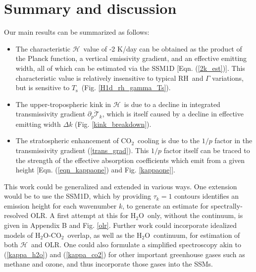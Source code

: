 \documentclass{ametsoc}
\newcommand{\eqnref}[1]{(\ref{#1})}
\newcommand{\ppp}{\ensuremath{\partial_p}}
\newcommand{\Ts}{\ensuremath{T_\mathrm{s}}}
\newcommand{\cotwo}{\ensuremath{\mathrm{CO_2}}}
\newcommand{\htwo}{\ensuremath{\mathrm{H_2O}}}
\newcommand{\RH}{\ensuremath{\mathrm{RH}}}
\newcommand{\trans}{\ensuremath{\mathcal{T}}}
\newcommand{\ch}{\ensuremath{\mathcal{H}}}
\newcommand{\tauk}{\ensuremath{\tau_k}}
\begin{document}
\section{Summary and discussion} \label{sec_summary}
Our main results can be summarized as follows:
\begin{itemize}
	\item The characteristic \ch\ value of  -2 K/day can be obtained as the product of the Planck function, a vertical emissivity gradient, and an effective emitting width, all of which can be estimated via the SSM1D [Eqn. \eqnref{2k_est}]. This characteristic value is relatively insensitive to typical \RH\ and $\Gamma$ variations, but is sensitive to \Ts\ (Fig. \ref{H1d_rh_gamma_Ts}).
	\item  The upper-tropospheric kink in \ch\ is due to a decline in integrated transmissivity gradient $\overline{\ppp \trans_k}$, which is itself caused by a decline in effective emitting width $\Delta k$ (Fig. \ref{kink_breakdown}). 
	\item The stratospheric enhancement of \cotwo\ cooling is due to the $1/p$ factor in the transmissivity gradient \eqnref{trans_grad}. This $1/p$ factor itself can be traced to the strength of the effective absorption coefficients which emit from a given height [Eqn. \eqnref{eqn_kappaone} and Fig. \ref{kappaone}].		
\end{itemize}

This work could be generalized and extended in various ways. One extension would be to use the SSM1D, which by providing $\tauk=1$ contours identifies an emission height for each wavenumber $k$, to generate an estimate for spectrally-resolved OLR. A first attempt at this for \htwo\ only, without the continuum, is given in Appendix B and Fig. \ref{olr}. Further work could incorporate idealized models of  \htwo-\cotwo\ overlap, as well as the \htwo\ continuum, for estimation of both \ch\ and OLR. One could also formulate a simplified spectroscopy akin to \eqnref{kappa_h2o} and \eqnref{kappa_co2}  for other important greenhouse gases such as methane and ozone, and thus incorporate those gases into the SSMs.
\end{document}
